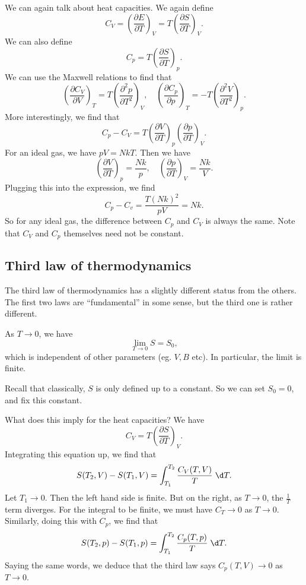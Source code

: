 \documentclass[a4paper]{article}
\begin{document}
We can again talk about heat capacities. We again define
\[
  C_V = \left(\frac{\partial E}{\partial T}\right)_V = T \left(\frac{\partial S}{\partial T}\right)_V.
\]
We can also define
\[
  C_p = T \left(\frac{\partial S}{\partial T}\right)_p.
\]
We can use the Maxwell relations to find that
\[
  \left(\frac{\partial C_V}{\partial V}\right)_T = T \left(\frac{\partial^2 p}{\partial T^2}\right)_V,\quad
  \left(\frac{\partial C_p}{\partial p}\right)_T = - T \left(\frac{\partial^2 V}{\partial T^2}\right)_p.
\]
More interestingly, we find that
\[
  C_p - C_V = T \left(\frac{\partial V}{\partial T}\right)_p \left(\frac{\partial p}{\partial T}\right)_V.
\]
For an ideal gas, we have $pV = NkT$. Then we have
\[
  \left(\frac{\partial V}{\partial T}\right)_p = \frac{Nk}{p},\quad \left(\frac{\partial p}{\partial T}\right)_V = \frac{Nk}{V}.
\]
Plugging this into the expression, we find
\[
  C_p - C_v = \frac{T(Nk)^2}{pV} = Nk.
\]
So for any ideal gas, the difference between $C_p$ and $C_V$ is always the same. Note that $C_V$ and $C_p$ themselves need not be constant.

\subsection{Third law of thermodynamics}
The third law of thermodynamics has a slightly different status from the others. The first two laws are ``fundamental'' in some sense, but the third one is rather different.
\begin{law}
  As $T \to 0$, we have
  \[
    \lim_{T \to 0}S = S_0,
  \]
  which is independent of other parameters (eg. $V, B$ etc). In particular, the limit is finite.
\end{law}
Recall that classically, $S$ is only defined up to a constant. So we can set $S_0 = 0$, and fix this constant.

What does this imply for the heat capacities? We have
\[
  C_V = T \left(\frac{\partial S}{\partial T}\right)_V.
\]
Integrating this equation up, we find that
\[
  S(T_2, V) - S(T_1, V) = \int_{T_1}^{T_2} \frac{C_V(T, V)}{T}\;\d T.
\]
Let $T_1 \to 0$. Then the left hand side is finite. But on the right, as $T \to 0$, the $\frac{1}{T}$ term diverges. For the integral to be finite, we must have $C_T \to 0$ as $T \to 0$. Similarly, doing this with $C_p$, we find that
\[
  S(T_2, p) - S(T_1, p) = \int_{T_1}^{T_2} \frac{C_p(T, p)}{T}\;\d T.
\]
Saying the same words, we deduce that the third law says $C_p(T, V) \to 0$ as $T \to 0$.
\end{document}
